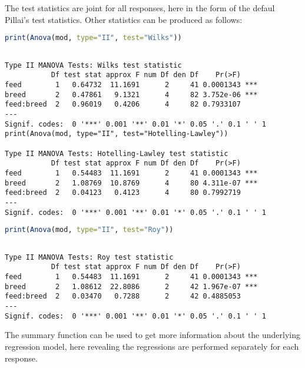 The test statistics are joint for all responses, here in the form of the
defaul Pillai's test statistics. Other statistics can be produced as
follows:

\begin{lstlisting}[language=R, columns=fullflexible, basicstyle=\linespread{0.85}\small\ttfamily, stringstyle=\color{DarkGreen}, keywordstyle=\color{blue}, commentstyle=\color{DarkGreen},]
print(Anova(mod, type="II", test="Wilks"))
\end{lstlisting}
\begin{Verbatim}[fontsize=\small]

Type II MANOVA Tests: Wilks test statistic
           Df test stat approx F num Df den Df    Pr(>F)
feed        1   0.64732  11.1691      2     41 0.0001343 ***
breed       2   0.47861   9.1321      4     82 3.752e-06 ***
feed:breed  2   0.96019   0.4206      4     82 0.7933107
---
Signif. codes:  0 '***' 0.001 '**' 0.01 '*' 0.05 '.' 0.1 ' ' 1
print(Anova(mod, type="II", test="Hotelling-Lawley"))

Type II MANOVA Tests: Hotelling-Lawley test statistic
           Df test stat approx F num Df den Df    Pr(>F)
feed        1   0.54483  11.1691      2     41 0.0001343 ***
breed       2   1.08769  10.8769      4     80 4.311e-07 ***
feed:breed  2   0.04123   0.4123      4     80 0.7992719
---
Signif. codes:  0 '***' 0.001 '**' 0.01 '*' 0.05 '.' 0.1 ' ' 1
\end{Verbatim}
\begin{lstlisting}[language=R, columns=fullflexible, basicstyle=\linespread{0.85}\small\ttfamily, stringstyle=\color{DarkGreen}, keywordstyle=\color{blue}, commentstyle=\color{DarkGreen},]
print(Anova(mod, type="II", test="Roy"))
\end{lstlisting}
\begin{Verbatim}[fontsize=\small]

Type II MANOVA Tests: Roy test statistic
           Df test stat approx F num Df den Df    Pr(>F)
feed        1   0.54483  11.1691      2     41 0.0001343 ***
breed       2   1.08612  22.8086      2     42 1.967e-07 ***
feed:breed  2   0.03470   0.7288      2     42 0.4885053
---
Signif. codes:  0 '***' 0.001 '**' 0.01 '*' 0.05 '.' 0.1 ' ' 1
\end{Verbatim}

The summary function can be used to get more information about the
underlying regression model, here revealing the regressions are
performed separately for each response.

